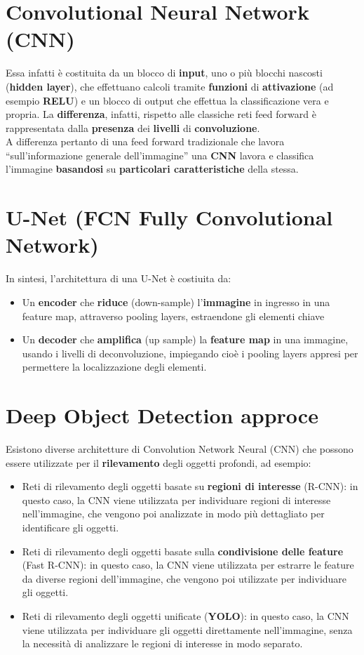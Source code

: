 \documentclass{article}
\begin{document}
\section{Convolutional Neural Network (CNN)}
Essa infatti è costituita da  un blocco di \textbf{input}, uno o più blocchi nascosti (\textbf{hidden layer}), che effettuano calcoli tramite \textbf{funzioni} di \textbf{attivazione} (ad esempio \textbf{RELU})  e un blocco di output che effettua la classificazione vera e propria. La \textbf{differenza}, infatti,  rispetto alle classiche reti feed forward è rappresentata dalla \textbf{presenza} dei \textbf{livelli} di \textbf{convoluzione}.\\
A differenza pertanto di una feed forward tradizionale che lavora “sull’informazione generale dell’immagine”  una \textbf{CNN} lavora e classifica l’immagine \textbf{basandosi} su \textbf{particolari caratteristiche} della stessa.


\section{U-Net (FCN Fully Convolutional Network)}
In sintesi, l’architettura di una U-Net è costiuita da:
\begin{itemize}
    \item Un \textbf{encoder} che \textbf{riduce} (down-sample) l’\textbf{immagine} in ingresso in una feature map, attraverso pooling layers, estraendone gli elementi chiave
    \item Un \textbf{decoder} che \textbf{amplifica} (up sample) la \textbf{feature map} in una immagine, usando i livelli di deconvoluzione, impiegando cioè i pooling layers appresi per permettere la localizzazione degli elementi.
\end{itemize}

\section{Deep Object Detection approce}
Esistono diverse architetture di Convolution Network Neural (CNN) che possono essere utilizzate per il \textbf{rilevamento} degli oggetti profondi, ad esempio:
\begin{itemize}
    \item Reti di rilevamento degli oggetti basate su \textbf{regioni di interesse} (R-CNN): in questo caso, la CNN viene utilizzata per individuare regioni di interesse nell'immagine, che vengono poi analizzate in modo più dettagliato per identificare gli oggetti.
    \item Reti di rilevamento degli oggetti basate sulla \textbf{condivisione delle feature} (Fast R-CNN): in questo caso, la CNN viene utilizzata per estrarre le feature da diverse regioni dell'immagine, che vengono poi utilizzate per individuare gli oggetti.
    \item Reti di rilevamento degli oggetti unificate (\textbf{YOLO}): in questo caso, la CNN viene utilizzata per individuare gli oggetti direttamente nell'immagine, senza la necessità di analizzare le regioni di interesse in modo separato.
\end{itemize}
\end{document}
